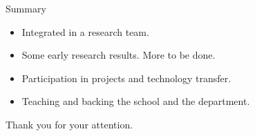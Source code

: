 \documentclass{beamer}
\begin{document}
{
\begin{frame}[plain]
\end{frame}
}

{
\begin{frame}[plain]
\end{frame}
}

{
\begin{frame}[plain]
\end{frame}
}

\begin{frame}{Summary}

  \begin{block}{}
        \begin{center}
          \begin{itemize}
            \item Integrated in a research team.
            \item Some early research results. More to be done.
            \item Participation in projects and technology transfer.
            \item Teaching and backing the school and the department.
          \end{itemize}
        \end{center}
  \end{block}
  
  \vskip 1cm
        \begin{center}
          Thank you for your attention. 

        \end{center}
\end{frame}
\end{document}
